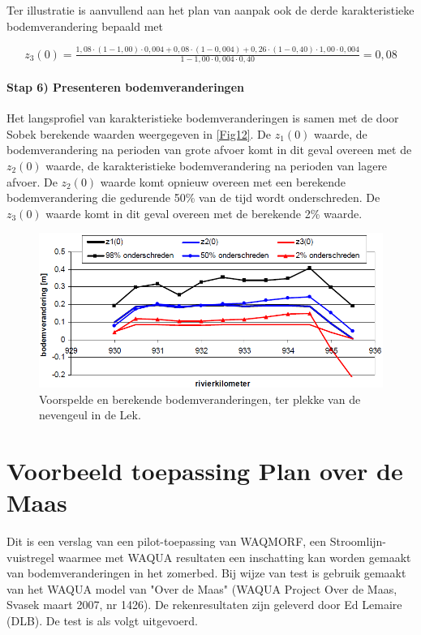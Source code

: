 Ter illustratie is aanvullend aan het plan van aanpak ook de derde karakteristieke bodemverandering bepaald met

\begin{equation}
z_3(0) = \tfrac{1,08 \cdot (1-1,00) \cdot 0,004 + 0,08 \cdot (1-0,004) + 0,26 \cdot (1-0,40) \cdot 1,00 \cdot 0,004}{1 - 1,00 \cdot 0,004 \cdot 0,40} = 0,08
\end{equation}

\subsubsection*{Stap 6) Presenteren bodemveranderingen}

Het langsprofiel van karakteristieke bodemveranderingen is samen met de door Sobek berekende waarden weergegeven in \autoref{Fig12}.
De $z_1(0)$ waarde, de bodemverandering na perioden van grote afvoer komt in dit geval overeen met de $z_2(0)$ waarde, de karakteristieke bodemverandering na perioden van lagere afvoer.
De $z_2(0)$ waarde komt opnieuw overeen met een berekende bodemverandering die gedurende 50\% van de tijd wordt onderschreden.
De $z_3(0)$ waarde komt in dit geval overeen met de berekende 2\% waarde.

\begin{figure}
\includegraphics[width=\columnwidth]{figures/Fig12.png}
\caption{Voorspelde en berekende bodemveranderingen, ter plekke van de nevengeul in de Lek.}
\label{Fig12}
\end{figure}

\chapter{Voorbeeld toepassing Plan over de Maas}

Dit is een verslag van een pilot-toepassing van WAQMORF, een Stroomlijn-vuistregel waarmee met WAQUA resultaten een inschatting kan worden gemaakt van bodemveranderingen in het zomerbed.
Bij wijze van test is gebruik gemaakt van het WAQUA model van "Over de Maas" (WAQUA Project Over de Maas, Svasek maart 2007, nr 1426). De rekenresultaten zijn geleverd door Ed Lemaire (DLB).
De test is als volgt uitgevoerd.

